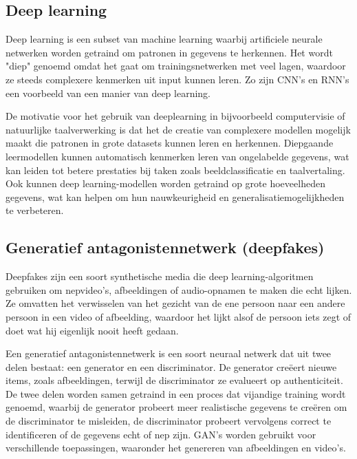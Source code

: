 \cite{biamonte2017quantum}

\subsection{Deep learning}

Deep learning is een subset van machine learning waarbij artificiele neurale netwerken worden getraind om patronen in gegevens te herkennen. Het wordt "diep" genoemd omdat het gaat om trainingsnetwerken met veel lagen, waardoor ze steeds complexere kenmerken uit input kunnen leren. Zo zijn CNN's en RNN's een voorbeeld van een manier van deep learning.

De motivatie voor het gebruik van deeplearning in bijvoorbeeld computervisie of natuurlijke taalverwerking is dat het de creatie van complexere modellen mogelijk maakt die patronen in grote datasets kunnen leren en herkennen. Diepgaande leermodellen kunnen automatisch kenmerken leren van ongelabelde gegevens, wat kan leiden tot betere prestaties bij taken zoals beeldclassificatie en taalvertaling. Ook kunnen deep learning-modellen worden getraind op grote hoeveelheden gegevens, wat kan helpen om hun nauwkeurigheid en generalisatiemogelijkheden te verbeteren.

\cite{yan2015deep}

\subsection{Generatief antagonistennetwerk (deepfakes)}

Deepfakes zijn een soort synthetische media die deep learning-algoritmen gebruiken om nepvideo's, afbeeldingen of audio-opnamen te maken die echt lijken. Ze omvatten het verwisselen van het gezicht van de ene persoon naar een andere persoon in een video of afbeelding, waardoor het lijkt alsof de persoon iets zegt of doet wat hij eigenlijk nooit heeft gedaan.

\cite{mahmud2021deep}

Een generatief antagonistennetwerk is een soort neuraal netwerk dat uit twee delen bestaat: een generator en een discriminator. De generator creëert nieuwe items, zoals afbeeldingen, terwijl de discriminator ze evalueert op authenticiteit. De twee delen worden samen getraind in een proces dat vijandige training wordt genoemd, waarbij de generator probeert meer realistische gegevens te creëren om de discriminator te misleiden, de discriminator probeert vervolgens correct te identificeren of de gegevens echt of nep zijn. GAN's worden gebruikt voor verschillende toepassingen, waaronder het genereren van afbeeldingen en video's.

